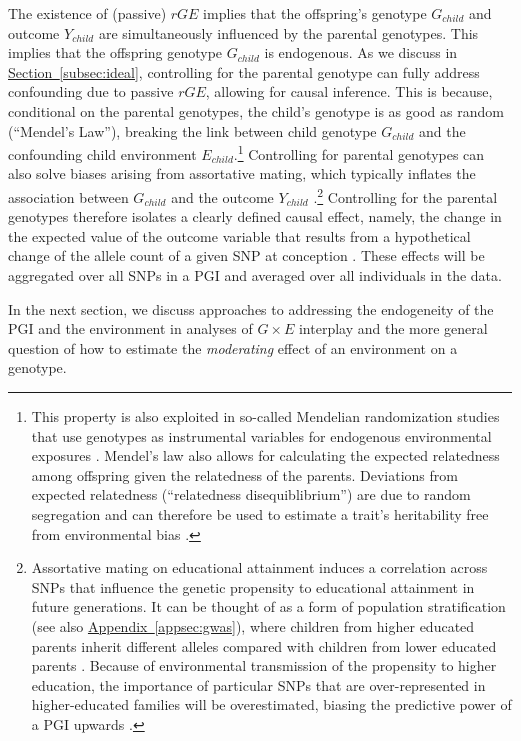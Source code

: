 \documentclass[12pt,a4paper]{article}
\begin{document}
\begin{bibunit}
The existence of (passive) $rGE$ implies that the offspring's genotype $G_{child}$ and outcome $Y_{child}$ are simultaneously influenced by the parental genotypes. This implies that the offspring genotype $G_{child}$ is endogenous. As we discuss in \hyperref[subsec:ideal]{Section~\ref*{subsec:ideal}}, controlling for the parental genotype can fully address confounding due to passive $rGE$, allowing for causal inference. This is because, conditional on the parental genotypes, the child's genotype is as good as random (``Mendel's Law''), breaking the link between child genotype $G_{child}$ and the confounding child environment $E_{child}$.\footnote{This property is also exploited in so-called Mendelian randomization studies that use genotypes as instrumental variables for endogenous environmental exposures \citep{VonHinke2016}. Mendel's law also allows for calculating the expected relatedness among offspring given the relatedness of the parents. Deviations from expected relatedness (``relatedness disequiblibrium'') are due to random segregation and can therefore be used to estimate a trait's heritability free from environmental bias \citep{young2018relatedness}.
} Controlling for parental genotypes can also solve biases arising from assortative mating, which typically inflates the association between $G_{child}$ and the outcome $Y_{child}$ \citep{young2023estimation}.\footnote{Assortative mating on educational attainment induces a correlation across SNPs that influence the genetic propensity to educational attainment in future generations. It can be thought of as a form of population stratification (see also \hyperref[appsec:gwas]{Appendix~\ref*{appsec:gwas}}), where children from higher educated parents inherit different alleles compared with children from lower educated parents \citep{morris2020population}. Because of environmental transmission of the propensity to higher education, the importance of particular SNPs that are over-represented in higher-educated families will be overestimated, biasing the predictive power of a PGI upwards \citep[e.g.,][]{Okbay2022}.} Controlling for the parental genotypes therefore isolates a clearly defined causal effect, namely, the change in the expected value of the outcome variable that results from a hypothetical change of the allele count of a given SNP at conception \citep{Benjamin2011}. These effects will be aggregated over all SNPs in a PGI and averaged over all individuals in the data.

In the next section, we discuss approaches to addressing the endogeneity of the PGI and the environment in analyses of $G \times E$ interplay and the more general question of how to estimate the \textit{moderating} effect of an environment on a genotype.   


\end{bibunit}
\end{document}
